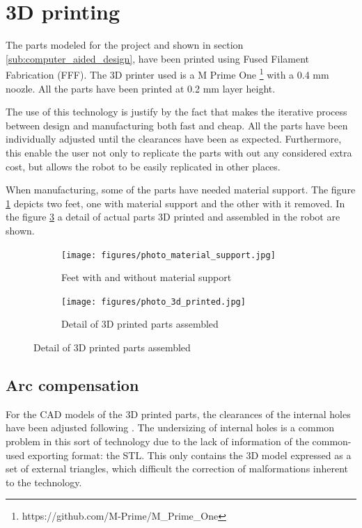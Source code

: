 \section{3D printing} %
\label{sec:3d_printing}
The parts modeled for the project and shown in section \ref{sub:computer_aided_design}, have been printed using Fused Filament Fabrication (FFF).
The 3D printer used is a M Prime One \footnote{https://github.com/M-Prime/M\_Prime\_One} with a 0.4 mm noozle.
All the parts have been printed at 0.2 mm layer height.

The use of this technology is justify by the fact that makes the iterative process between design and manufacturing both fast and cheap. 
All the parts have been individually adjusted until the clearances have been as expected.
Furthermore, this enable the user not only to replicate the parts with out any considered extra cost, but allows the robot to be easily replicated in other places.

When manufacturing, some of the parts have needed material support.
The figure \ref{fig:photo_material_support} depicts two feet, one with material support and the other with it removed.
In the figure \ref{fig:photo_3d_printed} a detail of actual parts 3D printed and assembled in the robot are shown.

\begin{figure}[ht]
    \centering
    \begin{subfigure}[b]{0.49\textwidth}
        \texttt{[image: figures/photo\_material\_support.jpg]}
        \caption{Feet with and without material support}
        \label{fig:photo_material_support}
    \end{subfigure}
    \begin{subfigure}[b]{0.49\textwidth}
        \texttt{[image: figures/photo\_3d\_printed.jpg]}
        \caption{Detail of 3D printed parts assembled}
        \label{fig:photo_3d_printed}
    \end{subfigure}
\end{figure}

  \subsection{Arc compensation} %
  \label{sub:arc_compensation}
  For the CAD models of the 3D printed parts, the clearances of the internal holes have been adjusted following \cite{arc_compensation}.
  The undersizing of internal holes is a common problem in this sort of technology due to the lack of information of the common-used exporting format: the STL.
  This only contains the 3D model expressed as a set of external triangles, which difficult the correction of malformations inherent to the technology.

